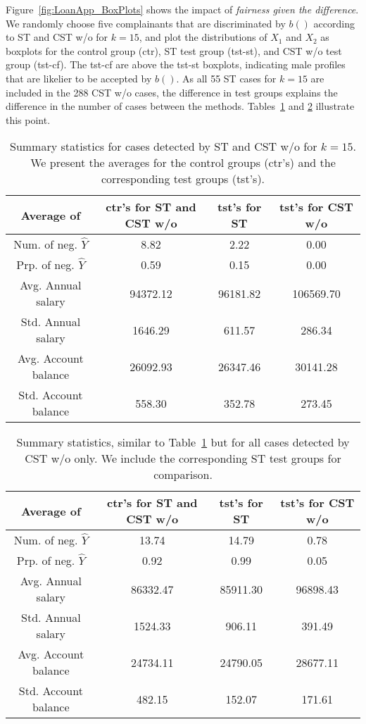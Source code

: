 Figure~\ref{fig:LoanApp_BoxPlots} shows the impact of \textit{fairness given the difference}.
We randomly choose five complainants that are discriminated by $b()$ according to ST and CST w/o for $k=15$, and plot the distributions of $X_1$ and $X_2$ as boxplots for the control group (ctr), ST test group (tst-st), and CST w/o test group (tst-cf).
The tst-cf are above the tst-st boxplots, indicating male profiles that are likelier to be accepted by $b()$. 
As all 55 ST cases for $k=15$ are included in the 288 CST w/o cases, the difference in test groups explains the difference in the number of cases between the methods.
Tables~\ref{table:k-results_for_STandCST} and \ref{table:k-results_for_CSTnotinST} illustrate this point.

%
\begin{table}[t]
\caption{Summary statistics for cases detected by ST and CST w/o for $k=15$. We present the averages for the control groups (ctr's) and the corresponding test groups (tst's).}
  \label{table:k-results_for_STandCST}
  \centering
  \begin{tabular}{cccc}
    \toprule
    Average of & ctr's for ST and CST w/o & tst's for ST & tst's for CST w/o \\
    \midrule
    Num. of neg. $\hat{Y}$ & 8.82 & 2.22 & 0.00 \\
    Prp. of neg. $\hat{Y}$ & 0.59 & 0.15 & 0.00 \\
    Avg. Annual salary & 94372.12 & 96181.82 & 106569.70 \\
    Std. Annual salary & 1646.29 & 611.57 & 286.34 \\
    Avg. Account balance & 26092.93 & 26347.46 & 30141.28 \\
    Std. Account balance & 558.30 & 352.78 & 273.45 \\
    \bottomrule
  \end{tabular}
\end{table}
%

%
\begin{table}[t]
\caption{Summary statistics, similar to Table~\ref{table:k-results_for_STandCST} but for all cases detected by CST w/o only. We include the corresponding ST test groups for comparison.}
  \label{table:k-results_for_CSTnotinST}
  \centering
  \begin{tabular}{cccc}
    \toprule
    Average of & ctr's for ST and CST w/o & tst's for ST & tst's for CST w/o \\
    \midrule
    Num. of neg. $\hat{Y}$ & 13.74 & 14.79 & 0.78 \\
    Prp. of neg. $\hat{Y}$ & 0.92 & 0.99 & 0.05 \\
    Avg. Annual salary & 86332.47 & 85911.30 & 96898.43 \\
    Std. Annual salary & 1524.33 & 906.11 & 391.49 \\
    Avg. Account balance & 24734.11 & 24790.05 & 28677.11 \\
    Std. Account balance & 482.15 & 152.07 & 171.61 \\
    \bottomrule
  \end{tabular}
\end{table}
%

